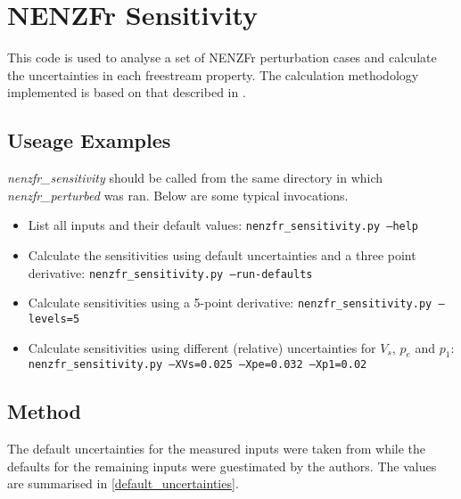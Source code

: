 
\newpage
\section{NENZFr Sensitivity}
\label{chapter-sensitivity}
This code is used to analyse a set of NENZFr perturbation cases and calculate the uncertainties in each freestream property. The calculation methodology implemented is based on that described in \cite{Mee_1993}.

\subsection{Useage Examples}
\textit{nenzfr\_sensitivity} should be called from the same directory in which \textit{nenzfr\_perturbed} was ran. Below are some typical invocations.
\begin{itemize}
\item List all inputs and their default values:
\newline
\texttt{nenzfr\_sensitivity.py --help}
\item Calculate the sensitivities using default uncertainties and a three point derivative: 
\newline
\texttt{nenzfr\_sensitivity.py --run-defaults}
\item Calculate sensitivities using a 5-point derivative:
\newline
\texttt{nenzfr\_sensitivity.py --levels=5}
\item Calculate sensitivities using different (relative) uncertainties for $V_s$, $p_e$ and $p_1$:
\newline
\texttt{nenzfr\_sensitivity.py --XVs=0.025 --Xpe=0.032 --Xp1=0.02}
\end{itemize}


\subsection{Method}
The default uncertainties for the measured inputs were taken from \cite{Kirchhartz_2009a} while the defaults for the remaining inputs were guestimated by the authors. The values are summarised in \cref{default_uncertainties}.

